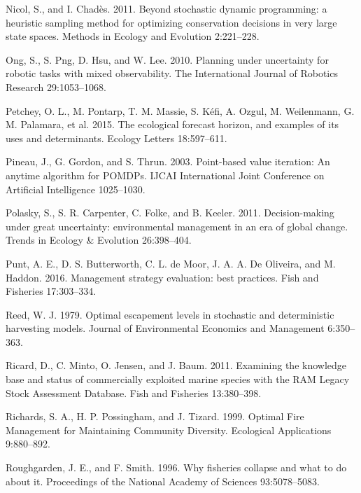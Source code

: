 \documentclass[3p]{elsarticle} %
\begin{document}
\leavevmode\hypertarget{ref-Nicol2011}{}%
Nicol, S., and I. Chadès. 2011. Beyond stochastic dynamic programming: a
heuristic sampling method for optimizing conservation decisions in very
large state spaces. Methods in Ecology and Evolution 2:221--228.

\leavevmode\hypertarget{ref-Ong2010}{}%
Ong, S., S. Png, D. Hsu, and W. Lee. 2010. Planning under uncertainty
for robotic tasks with mixed observability. The International Journal of
Robotics Research 29:1053--1068.

\leavevmode\hypertarget{ref-Petchy2015}{}%
Petchey, O. L., M. Pontarp, T. M. Massie, S. Kéfi, A. Ozgul, M.
Weilenmann, G. M. Palamara, et al. 2015. The ecological forecast
horizon, and examples of its uses and determinants. Ecology Letters
18:597--611.

\leavevmode\hypertarget{ref-Pineau2003}{}%
Pineau, J., G. Gordon, and S. Thrun. 2003. Point-based value iteration:
An anytime algorithm for POMDPs. IJCAI International Joint Conference on
Artificial Intelligence 1025--1030.

\leavevmode\hypertarget{ref-Polasky2011}{}%
Polasky, S., S. R. Carpenter, C. Folke, and B. Keeler. 2011.
Decision-making under great uncertainty: environmental management in an
era of global change. Trends in Ecology \& Evolution 26:398--404.

\leavevmode\hypertarget{ref-Punt2016}{}%
Punt, A. E., D. S. Butterworth, C. L. de Moor, J. A. A. De Oliveira, and
M. Haddon. 2016. Management strategy evaluation: best practices. Fish
and Fisheries 17:303--334.

\leavevmode\hypertarget{ref-Reed1979}{}%
Reed, W. J. 1979. Optimal escapement levels in stochastic and
deterministic harvesting models. Journal of Environmental Economics and
Management 6:350--363.

\leavevmode\hypertarget{ref-RAM}{}%
Ricard, D., C. Minto, O. Jensen, and J. Baum. 2011. Examining the
knowledge base and status of commercially exploited marine species with
the RAM Legacy Stock Assessment Database. Fish and Fisheries
13:380--398.

\leavevmode\hypertarget{ref-Richards1999}{}%
Richards, S. A., H. P. Possingham, and J. Tizard. 1999. Optimal Fire
Management for Maintaining Community Diversity. Ecological Applications
9:880--892.

\leavevmode\hypertarget{ref-Roughgarden1996}{}%
Roughgarden, J. E., and F. Smith. 1996. Why fisheries collapse and what
to do about it. Proceedings of the National Academy of Sciences
93:5078--5083.
\end{document}
